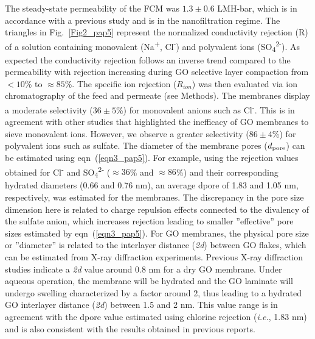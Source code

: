 The steady-state permeability of the FCM was $1.3\pm0.6$ LMH-bar, which is in accordance with a previous study and is in the nanofiltration regime.\cite{amadei2017role} The triangles in Fig.~\ref{Fig2_pap5} represent the normalized conductivity rejection (R) of a solution containing monovalent (Na\textsuperscript{+}, Cl\textsuperscript{-}) and polyvalent ions (SO\textsubscript{4}\textsuperscript{2-}). As expected the conductivity rejection follows an inverse trend compared to the permeability with rejection increasing during GO selective layer compaction from $<10$\% to $\approx85$\%.
The specific ion rejection ($R_{ion}$) was then evaluated via ion chromatography of the feed and permeate (see Methods). The membranes display a moderate selectivity ($36\pm5$\%) for monovalent anions such as Cl\textsuperscript{-}. This is in agreement with other studies that highlighted the inefficacy of  GO membranes to sieve monovalent ions.\cite{chen2017molecular,baskoro2018graphene} However, we observe a greater selectivity ($86\pm4$\%)  for polyvalent ions such as sulfate. The diameter of the membrane pores ($d\textsubscript{pore}$) can be estimated using eqn~(\ref{eqn3_pap5}). For example, using the rejection values obtained for Cl\textsuperscript{-} and SO\textsubscript{4}\textsuperscript{2-} ($\approx36$\% and $\approx86$\%) and their corresponding hydrated diameters (0.66 and 0.76 nm), an average dpore of 1.83 and 1.05 nm, respectively, was estimated for the membranes. The discrepancy in the pore size dimension here is related to charge repulsion effects connected to the divalency of the sulfate anion, which increases rejection leading to smaller ''effective'' pore sizes estimated by eqn~(\ref{eqn3_pap5}). 
For GO membranes, the physical pore size or ''diameter'' is related to the interlayer distance (\textit{2d}) between GO flakes, which can be estimated from X-ray diffraction experiments. Previous X-ray diffraction studies indicate a \textit{2d} value around 0.8 nm for a dry GO membrane.\cite{amadei2017role,qi2017strict,hung2014cross} Under aqueous operation, the membrane will be hydrated and the GO laminate will undergo swelling characterized by a factor around 2, thus leading to a hydrated GO interlayer distance (\textit{2d}) between 1.5 and 2 nm.\cite{thebo2018highly,talyzin2014structure,yang2017ultrathin} This value range is in agreement with the dpore value estimated using chlorine rejection (\textit{i.e.}, 1.83 nm) and is also consistent with the results obtained in previous reports.\cite{abraham2017tunable}
